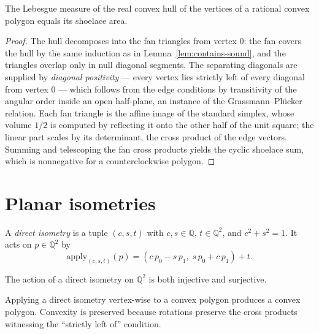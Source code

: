 \begin{lemma}
  \label{lem:area-bridge}
  \leanok
  The Lebesgue measure of the real convex hull of the vertices of a
  rational convex polygon equals its shoelace area.
\end{lemma}
\begin{proof}
  \leanok
  The hull decomposes into the fan triangles from vertex $0$: the fan
  covers the hull by the same induction as in
  Lemma~\ref{lem:contains-sound}, and the triangles overlap only in null
  diagonal segments. The separating diagonals are supplied by
  \emph{diagonal positivity} --- every vertex lies strictly left of every
  diagonal from vertex $0$ --- which follows from the edge conditions by
  transitivity of the angular order inside an open half-plane, an
  instance of the Grassmann--Pl\"ucker relation. Each fan triangle is the
  affine image of the standard simplex, whose volume $1/2$ is computed by
  reflecting it onto the other half of the unit square; the linear part
  scales by its determinant, the cross product of the edge vectors.
  Summing and telescoping the fan cross products yields the cyclic
  shoelace sum, which is nonnegative for a counterclockwise polygon.
\end{proof}

\chapter{Planar isometries}

\begin{definition}
  \label{def:direct-isometry}
  \leanok
  A \emph{direct isometry} is a tuple $(c, s, t)$ with $c, s \in \mathbb{Q}$,
  $t \in \mathbb{Q}^2$, and $c^2 + s^2 = 1$. It acts on $p \in \mathbb{Q}^2$
  by
  \[
    \mathrm{apply}_{(c,s,t)}(p) = (c\,p_0 - s\,p_1,\; s\,p_0 + c\,p_1) + t.
  \]
\end{definition}

\begin{lemma}
  \label{lem:isometry-bijective}
  \leanok
  The action of a direct isometry on $\mathbb{Q}^2$ is both injective and
  surjective.
\end{lemma}

\begin{definition}
  \label{def:applyPolygon}
  \leanok
  Applying a direct isometry vertex-wise to a convex polygon produces a
  convex polygon. Convexity is preserved because rotations preserve the
  cross products witnessing the ``strictly left of'' condition.
\end{definition}

